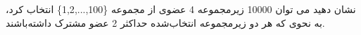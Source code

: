 \p
    نشان دهید می توان 10000 زیرمجموعه 4 عضوی از مجموعه \{100,...,1,2\} انتخاب کرد، به نحوی که هر دو    زیرمجموعه انتخاب‌شده حداکثر 2 عضو مشترک داشته‌باشند.